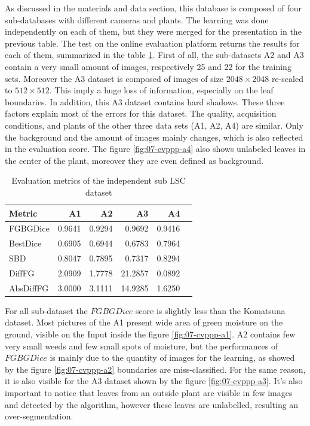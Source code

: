 \documentclass[../thesis.tex]{subfiles}
\begin{document}
    As discussed in the materials and data section, this database is composed of four sub-databases with different cameras and plants. The learning was done independently on each of them, but they were merged for the presentation in the previous table. The test on the online evaluation platform returns the results for each of them, summarized in the table \ref{tab:eval-sub-cvppp}. First of all, the sub-datasets A2 and A3 contain a very small amount of images, respectively 25 and 22 for the training sets. Moreover the A3 dataset is composed of images of size $2048 \times 2048$ re-scaled to $512 \times 512$. This imply a huge loss of information, especially on the leaf boundaries. In addition, this A3 dataset contains hard shadows. These three factors explain most of the errors for this dataset. The quality, acquisition conditions, and plants of the other three data sets (A1, A2, A4) are similar. Only the background and the amount of images mainly changes, which is also reflected in the evaluation score. The figure \ref{fig:07-cvppp-a4} also shows unlabeled leaves in the center of the plant, moreover they are even defined as background.
    
    \begin{table}[H]
        \begin{tabularx}{\linewidth}{|X|r|r|r|r|r|}
            \hline
            \textbf{Metric} 	&    A1   &   A2   &     A3   &   A4   \\ \hline
            FGBGDice 			&  0.9641 & 0.9294 &   0.9692 & 0.9416 \\
            BestDice 			&  0.6905 & 0.6944 &   0.6783 & 0.7964 \\
            SBD 	            &  0.8047 & 0.7895 &   0.7317 & 0.8294 \\
            DiffFG 		        &  2.0909 & 1.7778 &  21.2857 & 0.0892 \\
            AbsDiffFG 	        &  3.0000 & 3.1111 &  14.9285 & 1.6250 \\
            \hline
        \end{tabularx}
        \caption{Evaluation metrics of the independent sub LSC dataset}
        \label{tab:eval-sub-cvppp}
    \end{table}
    
    For all sub-dataset the $FGBGDice$ score is slightly less than the Komatsuna dataset. Most pictures of the A1 present wide area of green moisture on the ground, visible on the Input inside the figure \ref{fig:07-cvppp-a1}. A2 contains few very small weeds and few small spots of moisture, but the performances of $FGBGDice$ is mainly due to the quantity of images for the learning, as showed by the figure \ref{fig:07-cvppp-a2} boundaries are miss-classified. For the same reason, it is also visible for the A3 dataset shown by the figure \ref{fig:07-cvppp-a3}. It's also important to notice that leaves from an outside plant are visible in few images and detected by the algorithm, however these leaves are unlabelled, resulting an over-segmentation.
    
\end{document}
